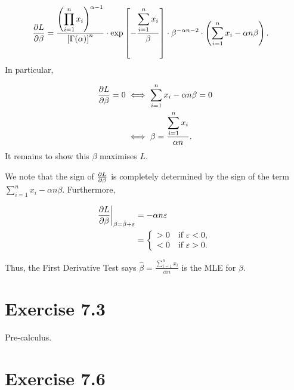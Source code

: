 \documentclass[12pt,letterpaper,reqno]{amsart}
\numberwithin{equation}{subsection}
\begin{document}
\begin{align*}
    \frac{\partial {L}}{\partial {\beta}} &= \frac{\displaystyle \left( \prod_{i=1}^n x_i \right)^{\alpha - 1}}{\left[{\Gamma}\! \left( {\alpha} \right) \right]^n} \cdot  \exp \left[- \frac{\displaystyle \sum_{i=1}^n x_i}{\beta} \right] \cdot \beta^{-\alpha n-2} \cdot \left( \sum_{i=1}^n x_i - \alpha n \beta \right).
\end{align*}
In particular,

\begin{align*}
    \frac{\partial {L}}{\partial {\beta}} = 0 &\iff \sum_{i=1}^n x_i - \alpha n \beta = 0 \\
    &\iff \beta = \frac{\displaystyle \sum_{i=1}^n x_i}{\alpha n}.
\end{align*}
It remains to show this $\beta$ maximises $L$.

We note that the sign of $\frac{\partial {L}}{\partial {\beta}}$ is completely determined by the sign of the term $\sum_{i=1}^n x_i - \alpha n \beta$. Furthermore,

\begin{align*}
    \left. \frac{\partial {L}}{\partial {\beta}} \right\vert_{\beta = \hat{\beta} + \varepsilon} &= - \alpha n \varepsilon \\
    &= \left\{ \begin{array}{cl}
       > 0  & \mbox{if $\varepsilon < 0$,}  \\
       < 0 & \mbox{if $\varepsilon > 0$.}
    \end{array} \right.
\end{align*}



Thus, the First Derivative Test says $\hat{\beta} = \frac{\displaystyle \sum_{i=1}^n x_i}{\alpha n}$ is the MLE for $\beta$.

\newpage
\section{Exercise 7.3}

Pre-calculus.

\newpage
\section{Exercise 7.6}
\end{document}
